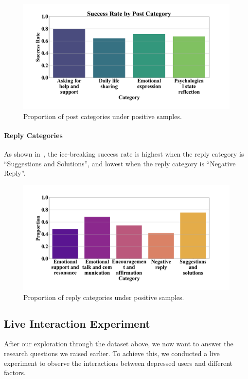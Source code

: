 \begin{figure}[th]
    \centering
    \includegraphics[width=1\columnwidth]{images/success_post.png}
    \caption{Proportion of post categories under positive samples.}
    \label{fig:success_post}
\end{figure}

\paragraph{Reply Categories}
As shown in~, the ice-breaking success rate is highest when the reply category is ``Suggestions and Solutions'', and lowest when the reply category is ``Negative Reply''.

\begin{figure}[th]
    \centering
    \includegraphics[width=1\columnwidth]{images/success_reply.png}
    \caption{Proportion of reply categories under positive samples.}
    \label{fig:success_reply}
\end{figure}

\subsection{Live Interaction Experiment}
After our exploration through the dataset above, we now want to answer the research questions we raised earlier. To achieve this, we conducted a live experiment to observe the interactions between depressed users and different factors.
\label{sec:result_chatbot}
